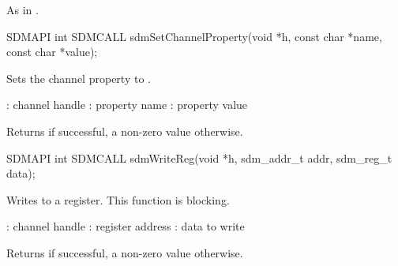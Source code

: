 \documentclass[a4paper,12pt,twoside,extrafontsizes]{memoir}
\begin{document}
\begin{funcret}
	As in .
\end{funcret}



\begin{cfuncprototype}
SDMAPI int SDMCALL sdmSetChannelProperty(void *h, const char *name, const char *value);
\end{cfuncprototype}

\begin{funcdescr}
	Sets the channel property  to .
\end{funcdescr}

\begin{funcparams}
	: channel handle
	: property name
	: property value
\end{funcparams}

\begin{funcret}
	Returns  if successful, a non-zero value otherwise.
\end{funcret}



\begin{cfuncprototype}
SDMAPI int SDMCALL sdmWriteReg(void *h, sdm_addr_t addr, sdm_reg_t data);
\end{cfuncprototype}

\begin{funcdescr}
	Writes to a register. This function is blocking.
\end{funcdescr}

\begin{funcparams}
	: channel handle
	: register address
	: data to write
\end{funcparams}

\begin{funcret}
	Returns  if successful, a non-zero value otherwise.
\end{funcret}


\end{document}
